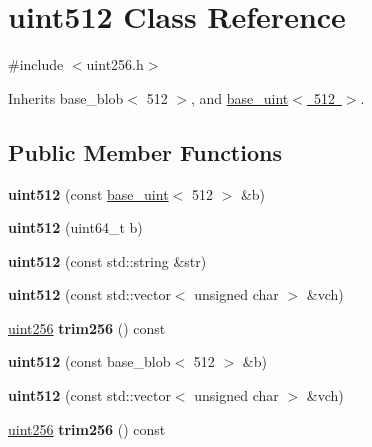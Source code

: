 \hypertarget{classuint512}{}\section{uint512 Class Reference}
\label{classuint512}


{\ttfamily \#include $<$uint256.\+h$>$}



Inherits base\+\_\+blob$<$ 512 $>$, and \mbox{\hyperlink{classbase__uint}{base\+\_\+uint$<$ 512 $>$}}.

\subsection*{Public Member Functions}
\begin{DoxyCompactItemize}
\item 
\mbox{\label{classuint512_a7650e39f0ddd7401d6f9edb70cc30715}} 
{\bfseries uint512} (const \mbox{\hyperlink{classbase__uint}{base\+\_\+uint}}$<$ 512 $>$ \&b)
\item 
\mbox{\label{classuint512_a9b0342e991f4a3f858c9744a671b83d2}} 
{\bfseries uint512} (uint64\+\_\+t b)
\item 
\mbox{\label{classuint512_a407d2a7a59005a57e848327014c7d2b5}} 
{\bfseries uint512} (const std\+::string \&str)
\item 
\mbox{\label{classuint512_a017c6e9933a94a0d9b2eb2fff280065a}} 
{\bfseries uint512} (const std\+::vector$<$ unsigned char $>$ \&vch)
\item 
\mbox{\label{classuint512_a90ae45972cae81e4e2d941ebe927b65c}} 
\mbox{\hyperlink{classuint256}{uint256}} {\bfseries trim256} () const
\item 
\mbox{\label{classuint512_a2f7397da9bcf317c37b246f217c47999}} 
{\bfseries uint512} (const base\+\_\+blob$<$ 512 $>$ \&b)
\item 
\mbox{\label{classuint512_a017c6e9933a94a0d9b2eb2fff280065a}} 
{\bfseries uint512} (const std\+::vector$<$ unsigned char $>$ \&vch)
\item 
\mbox{\label{classuint512_a90ae45972cae81e4e2d941ebe927b65c}} 
\mbox{\hyperlink{classuint256}{uint256}} {\bfseries trim256} () const
\end{DoxyCompactItemize}
